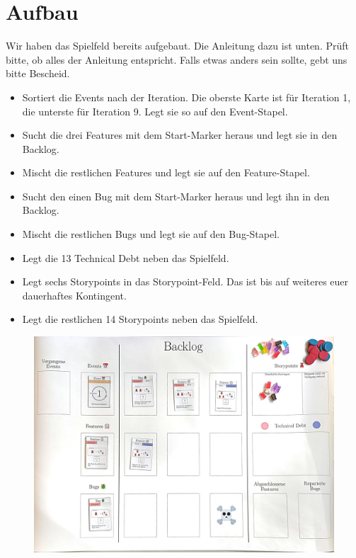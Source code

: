 \documentclass[a4paper, 11pt]{scrartcl}
\begin{document}
\section*{Aufbau}

\noindent Wir haben das Spielfeld bereits aufgebaut. Die Anleitung dazu ist unten. Prüft bitte, ob alles der Anleitung entspricht. Falls etwas anders sein sollte, gebt uns bitte Bescheid.

\begin{itemize}
    \item Sortiert die Events nach der Iteration. Die oberste Karte ist für Iteration 1, die unterste für Iteration 9. Legt sie so auf den Event-Stapel.
    \item Sucht die drei Features mit dem Start-Marker heraus und legt sie in den Backlog.
    \item Mischt die restlichen Features und legt sie auf den Feature-Stapel.
    \item Sucht den einen Bug mit dem Start-Marker heraus und legt ihn in den Backlog.
    \item Mischt die restlichen Bugs und legt sie auf den Bug-Stapel.
    \item Legt die 13 Technical Debt neben das Spielfeld.
    \item Legt sechs Storypoints in das Storypoint-Feld. Das ist bis auf weiteres euer dauerhaftes Kontingent.
    \item Legt die restlichen 14 Storypoints neben das Spielfeld.
\end{itemize}

\begin{figure}[H]
    \centering
    \includegraphics[width=\textwidth]{images/spielfeld_aufgebaut.jpg}
\end{figure}
\end{document}
